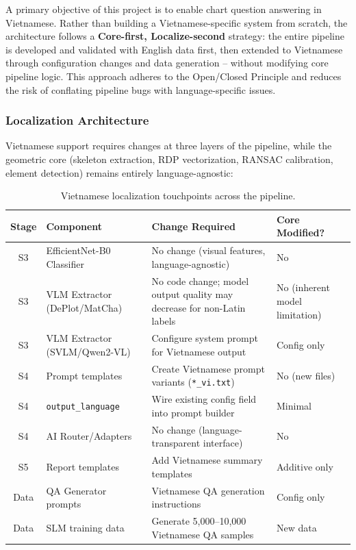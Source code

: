 A primary objective of this project is to enable chart question answering in Vietnamese.
Rather than building a Vietnamese-specific system from scratch, the architecture follows
a \textbf{Core-first, Localize-second} strategy: the entire pipeline is developed and
validated with English data first, then extended to Vietnamese through configuration
changes and data generation -- without modifying core pipeline logic. This approach
adheres to the Open/Closed Principle and reduces the risk of conflating pipeline bugs
with language-specific issues.

\subsubsection{Localization Architecture}

Vietnamese support requires changes at three layers of the pipeline, while the geometric
core (skeleton extraction, RDP vectorization, RANSAC calibration, element detection)
remains entirely language-agnostic:

\begin{table}[htbp]
\centering
\caption{Vietnamese localization touchpoints across the pipeline.}
\label{tab:viet_touchpoints}
\begin{tabular}{@{}clll@{}}
\toprule
\textbf{Stage} & \textbf{Component} & \textbf{Change Required} & \textbf{Core Modified?} \\
\midrule
S3 & EfficientNet-B0 Classifier & No change (visual features, language-agnostic) & No \\
S3 & VLM Extractor (DePlot/MatCha) & No code change; model output quality may decrease for non-Latin labels & No (inherent model limitation) \\
S3 & VLM Extractor (SVLM/Qwen2-VL) & Configure system prompt for Vietnamese output & Config only \\
S4 & Prompt templates & Create Vietnamese prompt variants (\texttt{*\_vi.txt}) & No (new files) \\
S4 & \texttt{output\_language} & Wire existing config field into prompt builder & Minimal \\
S4 & AI Router/Adapters & No change (language-transparent interface) & No \\
S5 & Report templates & Add Vietnamese summary templates & Additive only \\
Data & QA Generator prompts & Vietnamese QA generation instructions & Config only \\
Data & SLM training data & Generate 5,000--10,000 Vietnamese QA samples & New data \\
\bottomrule
\end{tabular}
\end{table}


